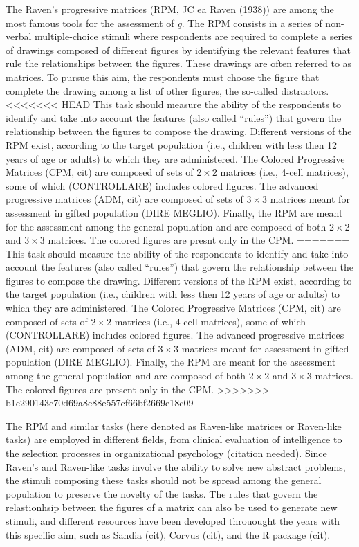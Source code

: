 The Raven's progressive matrices (RPM, JC ea Raven (1938)) are among the most famous tools for the assessment of \emph{g}. The RPM consists in a series of non-verbal multiple-choice stimuli where respondents are required to complete a series of drawings composed of different figures by identifying the relevant features that rule the relationships between the figures. These drawings are often referred to as matrices.
To pursue this aim, the respondents must choose the figure that complete the drawing among a list of other figures, the so-called distractors.
<<<<<<< HEAD
This task should measure the ability of the respondents to identify and take into account the features (also called ``rules'') that govern the relationship between the figures to compose the drawing. Different versions of the RPM exist, according to the target population (i.e., children with less then 12 years of age or adults) to which they are administered. The Colored Progressive Matrices (CPM, cit) are composed of sets of \(2\times2\) matrices (i.e., 4-cell matrices), some of which (CONTROLLARE) includes colored figures. The advanced progressive matrices (ADM, cit) are composed of sets of \(3\times3\) matrices meant for assessment in gifted population (DIRE MEGLIO). Finally, the RPM are meant for the assessment among the general population and are composed of both \(2\times2\) and \(3\times3\) matrices. The colored figures are presnt only in the CPM.
=======
This task should measure the ability of the respondents to identify and take into account the features (also called ``rules'') that govern the relationship between the figures to compose the drawing. Different versions of the RPM exist, according to the target population (i.e., children with less then 12 years of age or adults) to which they are administered. The Colored Progressive Matrices (CPM, cit) are composed of sets of \(2\times2\) matrices (i.e., 4-cell matrices), some of which (CONTROLLARE) includes colored figures. The advanced progressive matrices (ADM, cit) are composed of sets of \(3\times3\) matrices meant for assessment in gifted population (DIRE MEGLIO). Finally, the RPM are meant for the assessment among the general population and are composed of both \(2\times2\) and \(3\times3\) matrices. The colored figures are present only in the CPM.
>>>>>>> b1c290143c70d69a8c88e557cf66bf2669e18c09

The RPM and similar tasks (here denoted as Raven-like matrices or Raven-like tasks) are employed in different fields, from clinical evaluation of intelligence to the selection processes in organizational psychology (citation needed).
Since Raven's and Raven-like tasks involve the ability to solve new abstract problems, the stimuli composing these tasks should not be spread among the general population to preserve the novelty of the tasks.
The rules that govern the relastionhsip between the figures of a matrix can also be used to generate new stimuli, and different resources have been developed throuought the years with this specific aim, such as Sandia (cit), Corvus (cit), and the R package  (cit).

